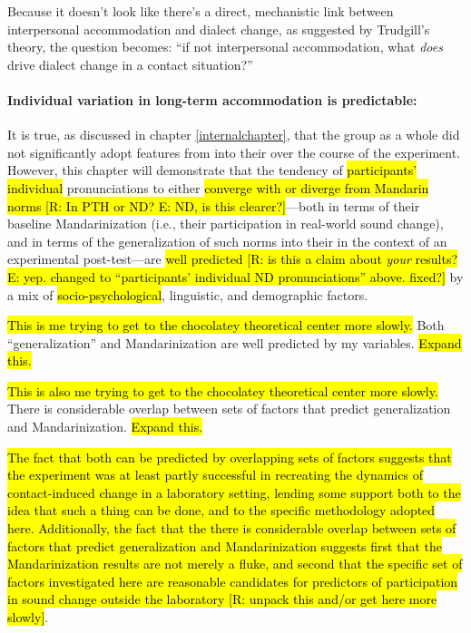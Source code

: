 Because it doesn't look like there's a direct, mechanistic link between interpersonal accommodation and dialect change, as suggested by Trudgill's \citeyearpar{trudgill1986dialects} theory, the question becomes: ``if not interpersonal accommodation, what \emph{does} drive dialect change in a contact situation?''

\paragraph{Individual variation in long-term accommodation is predictable:} It is true, as discussed in chapter \ref{internalchapter}, that the group as a whole did not significantly adopt features from \annie into their \ND{} over the course of the experiment. However, this chapter will demonstrate that the tendency of \hl{participants' individual} \ND{} pronunciations to either \hl{converge with or diverge from Mandarin norms [R: In PTH or ND? E: ND, is this clearer?]}---both in terms of their baseline \ND{} Mandarinization (i.e., their participation in real-world sound change), and in terms of the generalization of such norms into their \ND{} in the context of an experimental post-test---are \hl{well predicted [R: is this a claim about \emph{your} results? E: yep. changed to ``participants' individual ND pronunciations'' above. fixed?]} by a mix of \hl{socio-psychological}, linguistic, and demographic factors.

\hl{This is me trying to get to the chocolatey theoretical center more slowly.} Both ``generalization'' and Mandarinization are well predicted by my variables. \hl{Expand this.}

\hl{This is also me trying to get to the chocolatey theoretical center more slowly.} There is considerable overlap between sets of factors that predict generalization and Mandarinization. \hl{Expand this.}

\hl{The fact that both can be predicted by overlapping sets of factors suggests that the experiment was at least partly successful in recreating the dynamics of contact-induced change in a laboratory setting, lending some support both to the idea that such a thing can be done, and to the specific methodology adopted here. Additionally, the fact that the there is considerable overlap between sets of factors that predict generalization and Mandarinization suggests first that the Mandarinization results are not merely a fluke, and second that the specific set of factors investigated here are reasonable candidates for predictors of participation in sound change outside the laboratory [R: unpack this and/or get here more slowly]}.

